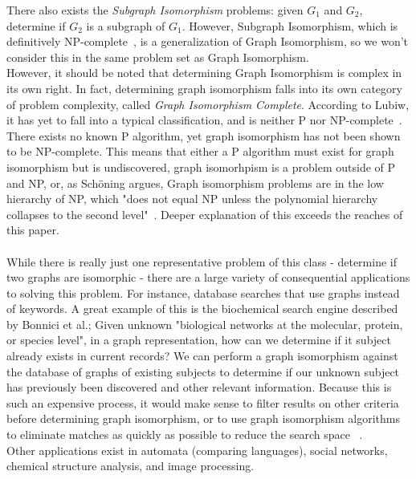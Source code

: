 \documentclass[letterpaper, 12pt]{article}
\begin{document}
    There also exists the \textit{Subgraph Isomorphism} problems: given $G_1$ and $G_2$,
    determine if $G_2$ is a subgraph of $G_1$. However, Subgraph Isomorphism, which is definitively NP-complete~\cite{cook1971complexity},
    is a generalization of Graph Isomorphism, so we won't consider this in the same problem set as Graph Isomorphism.
    \\
    However, it should be noted that determining
    Graph Isomorphism is complex in its own right. In fact, determining graph isomorphism falls
    into its own category of problem complexity, called \textit{Graph Isomorphism Complete}.
    According to Lubiw, it has yet to fall into a typical classification, and is neither P nor NP-complete~\cite{anna-complexity}.
    There exists no known P algorithm, yet graph isomorphism has not been shown to be NP-complete. This means that either a P algorithm
    must exist for graph isomorphism but is undiscovered, graph isomorhpism is a problem outside of
    P and NP, or, as Schöning argues, Graph isomorphism problems are in the low hierarchy of NP,
    which "does not equal NP unless the polynomial hierarchy collapses to the second level"~\cite{np-hierarchy}.
    Deeper explanation of this exceeds the reaches of this paper.
    \\
    \\
    While there is really just one representative problem of this class - determine if two graphs are isomorphic -
    there are a large variety of consequential applications to solving this problem. For instance,
    database searches that use graphs instead of keywords. A great example of this is the biochemical search
    engine described by Bonnici et al.; Given unknown "biological networks at the molecular, protein, or species level",
    in a graph representation, how can we determine if it subject already exists in current records?
    We can perform a graph isomorphism against the database of graphs of existing subjects
    to determine if our unknown subject has previously been discovered and other relevant information.
    Because this is such an expensive process, it would make sense to filter results on other criteria
    before determining graph isomorphism, or to use graph isomorphism algorithms to eliminate matches
    as quickly as possible to reduce the search space ~\cite{Bonnici2013}.
    \\
    Other applications exist in automata (comparing languages), social networks, chemical structure analysis,
    and image processing.
    \\\\
\end{document}
